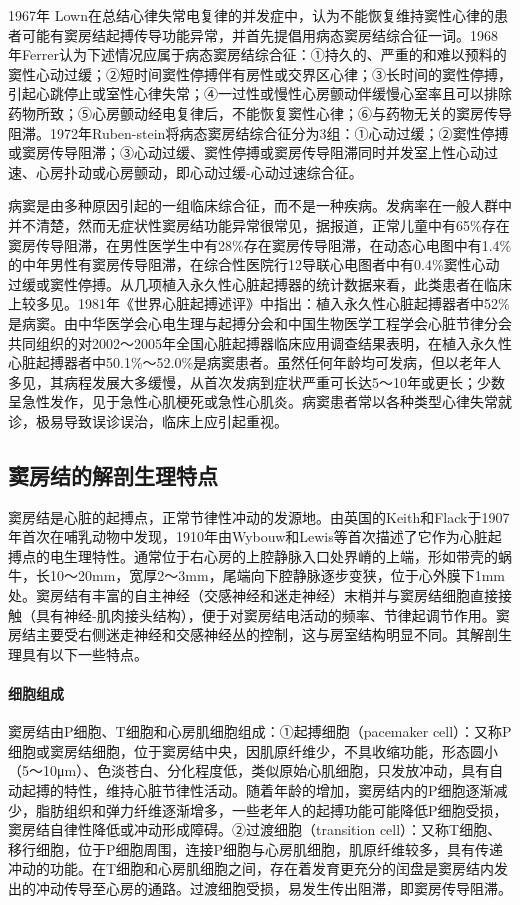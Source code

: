 1967年
Lown在总结心律失常电复律的并发症中，认为不能恢复维持窦性心律的患者可能有窦房结起搏传导功能异常，并首先提倡用病态窦房结综合征一词。1968
年Ferrer认为下述情况应属于病态窦房结综合征：①持久的、严重的和难以预料的窦性心动过缓；②短时间窦性停搏伴有房性或交界区心律；③长时间的窦性停搏，引起心跳停止或室性心律失常；④一过性或慢性心房颤动伴缓慢心室率且可以排除药物所致；⑤心房颤动经电复律后，不能恢复窦性心律；⑥与药物无关的窦房传导阻滞。1972年Ruben-stein将病态窦房结综合征分为3组：①心动过缓；②窦性停搏或窦房传导阻滞；③心动过缓、窦性停搏或窦房传导阻滞同时并发室上性心动过速、心房扑动或心房颤动，即心动过缓-心动过速综合征。

病窦是由多种原因引起的一组临床综合征，而不是一种疾病。发病率在一般人群中并不清楚，然而无症状性窦房结功能异常很常见，据报道，正常儿童中有65\%存在窦房传导阻滞，在男性医学生中有28\%存在窦房传导阻滞，在动态心电图中有1.4\%的中年男性有窦房传导阻滞，在综合性医院行12导联心电图者中有0.4\%窦性心动过缓或窦性停搏。从几项植入永久性心脏起搏器的统计数据来看，此类患者在临床上较多见。1981年《世界心脏起搏述评》中指出：植入永久性心脏起搏器者中52\%是病窦。由中华医学会心电生理与起搏分会和中国生物医学工程学会心脏节律分会共同组织的对2002～2005年全国心脏起搏器临床应用调查结果表明，在植入永久性心脏起搏器者中50.1\%～52.0\%是病窦患者。虽然任何年龄均可发病，但以老年人多见，其病程发展大多缓慢，从首次发病到症状严重可长达5～10年或更长；少数呈急性发作，见于急性心肌梗死或急性心肌炎。病窦患者常以各种类型心律失常就诊，极易导致误诊误治，临床上应引起重视。

\subsection{窦房结的解剖生理特点}

窦房结是心脏的起搏点，正常节律性冲动的发源地。由英国的Keith和Flack于1907年首次在哺乳动物中发现，1910年由Wybouw和Lewis等首次描述了它作为心脏起搏点的电生理特性。通常位于右心房的上腔静脉入口处界嵴的上端，形如带壳的蜗牛，长10～20mm，宽厚2～3mm，尾端向下腔静脉逐步变狭，位于心外膜下1mm处。窦房结有丰富的自主神经（交感神经和迷走神经）末梢并与窦房结细胞直接接触（具有神经-肌肉接头结构），便于对窦房结电活动的频率、节律起调节作用。窦房结主要受右侧迷走神经和交感神经丛的控制，这与房室结构明显不同。其解剖生理具有以下一些特点。

\paragraph{细胞组成}

窦房结由P细胞、T细胞和心房肌细胞组成：①起搏细胞（pacemaker
cell）：又称P细胞或窦房结细胞，位于窦房结中央，因肌原纤维少，不具收缩功能，形态圆小（5～10μm）、色淡苍白、分化程度低，类似原始心肌细胞，只发放冲动，具有自动起搏的特性，维持心脏节律性活动。随着年龄的增加，窦房结内的P细胞逐渐减少，脂肪组织和弹力纤维逐渐增多，一些老年人的起搏功能可能降低P细胞受损，窦房结自律性降低或冲动形成障碍。②过渡细胞（transition
cell）：又称T细胞、移行细胞，位于P细胞周围，连接P细胞与心房肌细胞，肌原纤维较多，具有传递冲动的功能。在T细胞和心房肌细胞之间，存在着发育更充分的闰盘是窦房结内发出的冲动传导至心房的通路。过渡细胞受损，易发生传出阻滞，即窦房传导阻滞。

